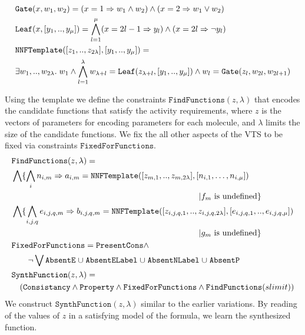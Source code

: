 
\begin{align*}
&\texttt{Gate}( x, w_1, w_2 ) = ( x  = 1 \Rightarrow w_1  \land w_2 ) \land  
( x = 2  \Rightarrow w_1  \lor w_2 ) \\
&\texttt{Leaf}( x, [y_1,..,y_\mu] ) =
\bigwedge\limits_{l=1}^{\mu} ( x = 2l-1  \Rightarrow y_{l}) \land ( x = 2l  \Rightarrow \lnot y_{l})\\
&\texttt{NNFTemplate}([z_1,..,z_{2\lambda}],[y_1,..,y_\mu] ) = \\
&\exists w_1,..,w_{2\lambda}.\;w_1 \land \bigwedge_{l=1}^{\lambda} w_{\lambda+l} = \texttt{Leaf}( z_{\lambda+l}, [y_1,..,y_\mu] ) \land
w_{l} = \texttt{Gate}( z_l, w_{2l},w_{2l+1})
\end{align*}

Using the template we define the constraints $\texttt{FindFunctions}(z,\lambda)$
that encodes the candidate functions that satisfy the activity requirements,
where $z$ is the vectors of parameters for encoding parameters
for each molecule,
and $\lambda$ limits the size of the candidate functions. 
%
We fix the all other aspects of the VTS to be fixed via constraints
$\texttt{FixedForFunctions}$.
%
\begin{align*}
&\texttt{FindFunctions}(z,\lambda) =\\
&\Land \{ \bigwedge\limits_{i} n_{i,m} \limplies a_{i,m} = 
\texttt{NNFTemplate}([z_{m,1},..,z_{m,2\lambda}],[n_{i,1},\dots,n_{i,\mu}] ) \\
& \hspace{8cm}|
\nodef_m \text{ is undefined}\} \\
&\Land \{ \bigwedge\limits_{i,j,q} e_{i,j,q,m} \limplies b_{i,j,q,m} = 
\texttt{NNFTemplate}([z_{i,j,q,1},..,z_{i,j,q,2\lambda}],[e_{i,j,q,1},..,e_{i,j,q,\mu}] ) \\
& \hspace{8cm} | \edgef_m \text{ is undefined}
\}\\
& \texttt{FixedForFunctions} = \texttt{PresentCons} \land\\
& \quad \quad
\lnot \Lor \texttt{AbsentE} \;\union\; \texttt{AbsentELabel} \;\union\;
\texttt{AbsentNLabel} \;\union\;
\texttt{AbsentP}\\
&\texttt{SynthFunction}(z,\lambda) = \\
& \quad
(  \texttt{Consistancy}\land \texttt{Property} \land
\texttt{FixedForFunctions} \land \texttt{FindFunctions}(slimit) )
\end{align*}
We construct $\texttt{SynthFunction}(z,\lambda)$ similar to the earlier
variations.
%
By reading of the values of $z$ in a satisfying model of the formula,
we learn the synthesized function.

